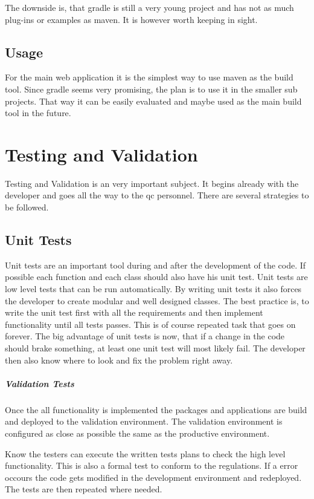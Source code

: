\documentclass[paper=a4,twoside=false,BCOR=0mm,DIV=calc,fontsize=12pt]{scrartcl}
\begin{document}
The downside is, that gradle is still a very young project and has not as much plug-ins or examples as maven. It is however worth keeping in sight.

\subsection{Usage}
For the main web application it is the simplest way to use maven as the build tool. Since gradle seems very promising, the plan is to use it in the
smaller sub projects. That way it can be easily evaluated and maybe used as the main build tool in the future.


\section{Testing and Validation}
Testing and Validation is an very important subject. It begins already with the developer and goes all the way to the qc personnel.
There are several strategies to be followed.

\subsection{Unit Tests}
Unit tests are an important tool during and after the development of the code. If possible each function and each class should also have his unit test. 
Unit tests are low level tests that can be run automatically. By writing unit tests it also forces the developer to create modular and well designed classes.
The best practice is, to write the unit test first with all the requirements and then implement functionality until all tests passes. This is of course repeated task 
that goes on forever.
The big advantage of unit tests is now, that if a change in the code should brake something, at least one unit test will most likely fail.
The developer then also know where to look and fix the problem right away.

\subparagraph{Validation Tests}
Once the all functionality is implemented the packages and applications are build and deployed to the validation environment. The validation environment is configured as 
close as possible the same as the productive environment.

Know the testers can execute the written tests plans to check the high level functionality. This is also a formal test to conform to the regulations. If a error occours 
the code gets modified in the development environment and redeployed. The tests are then repeated where needed.
\end{document}

